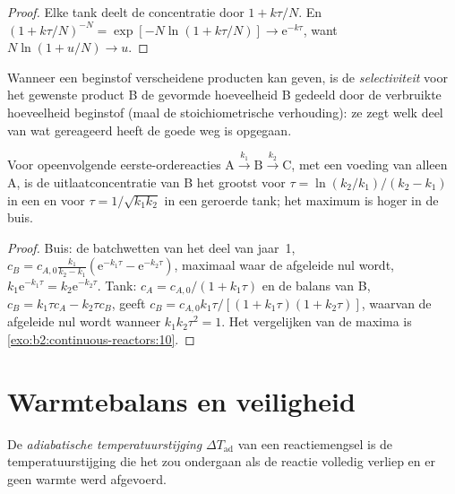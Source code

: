 \begin{proof}
Elke tank deelt de concentratie door $1 + k\tau/N$. En $(1 +
k\tau/N)^{-N} = \exp[-N\ln(1 + k\tau/N)] \to \mathrm e^{-k\tau}$, want
$N\ln(1 + u/N) \to u$.
\end{proof}

\begin{definition}[Selectiviteit]\label{def:b2:continuous-reactors:selectivity}
Wanneer een beginstof verscheidene producten kan geven, is de \emph{selectiviteit}
voor het gewenste product B de gevormde hoeveelheid B gedeeld door de verbruikte hoeveelheid
beginstof (maal de stoichiometrische verhouding): ze zegt welk deel van
wat gereageerd heeft de goede weg is opgegaan.
\end{definition}

\begin{proposition}\label{prop:b2:continuous-reactors:consecutive}
Voor opeenvolgende eerste-ordereacties $\mathrm A \xrightarrow{k_1} \mathrm B
\xrightarrow{k_2} \mathrm C$, met een voeding van alleen A, is de uitlaatconcentratie
van B het grootst voor $\tau = \ln(k_2/k_1)/(k_2 - k_1)$ in een
 en voor $\tau = 1/\sqrt{k_1k_2}$ in een geroerde tank; het
maximum is hoger in de buis.
\end{proposition}

\begin{proof}
Buis: de batchwetten van het deel van jaar~1, $c_B = c_{A,0}\frac{k_1}{k_2 - k_1}
(\mathrm e^{-k_1\tau} - \mathrm e^{-k_2\tau})$, maximaal waar de afgeleide
nul wordt, $k_1\mathrm e^{-k_1\tau} = k_2\mathrm e^{-k_2\tau}$. Tank: $c_A =
c_{A,0}/(1 + k_1\tau)$ en de balans van B, $c_B = k_1\tau c_A - k_2\tau c_B$,
geeft $c_B = c_{A,0}k_1\tau/[(1 + k_1\tau)(1 + k_2\tau)]$, waarvan de afgeleide
nul wordt wanneer $k_1k_2\tau^2 = 1$. Het vergelijken van de maxima is
\cref{exo:b2:continuous-reactors:10}.
\end{proof}

\section{Warmtebalans en veiligheid}

\begin{definition}\label{def:b2:continuous-reactors:adiabatic-rise}
De \emph{adiabatische temperatuurstijging}
$\Delta T_{\text{ad}}$ van een reactiemengsel is de temperatuurstijging die het
zou ondergaan als de reactie volledig verliep en er geen warmte werd afgevoerd.
\end{definition}

